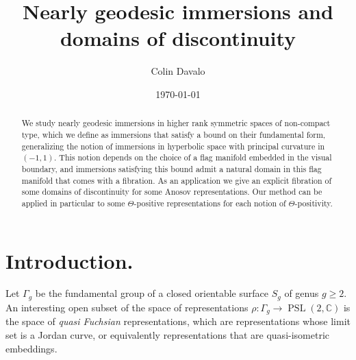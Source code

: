 \documentclass[reqno,10pt]{amsart}
\title{Nearly geodesic immersions and domains of discontinuity}
\author{Colin Davalo}
\date{\today}
\theoremstyle{plain}
\theoremstyle{definition}
\theoremstyle{remark}
\newcommand{\C}{\mathbb{C}}
\DeclareMathOperator{\PSL}{PSL}
\begin{document}
\begin{abstract}
We study nearly geodesic immersions in higher rank symmetric spaces of non-compact type, which we define as immersions that satisfy a bound on their fundamental form, generalizing the notion of immersions in hyperbolic space with principal curvature in $(-1,1)$. This notion depends on the choice of a flag manifold embedded in the visual boundary, and immersions satisfying this bound admit a natural domain in this flag manifold that comes with a fibration. As an application we give an explicit fibration of some domains of discontinuity for some Anosov representations. Our method can be applied in particular to some $\Theta$-positive representations for each notion of $\Theta$-positivity.




\end{abstract}

\maketitle

\tableofcontents

\section{Introduction.}

Let $\Gamma_g$ be the fundamental group of a closed orientable surface $S_g$ of genus $g\geq 2$. An interesting open subset of the space of representations $\rho:\Gamma_g\to \PSL(2,\C)$ is the space of \emph{quasi Fuchsian} representations, which are representations whose limit set is a Jordan curve, or equivalently representations that are quasi-isometric embeddings.
\end{document}
